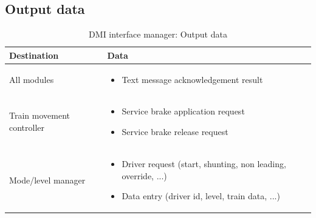 \documentclass[nocc]{template/openetcs_report}
\begin{document}
\subsection{Output data}
			\begin{longtable}{|l|l|}
				\caption{DMI interface manager: Output data}\\ 
				\hline
				
					\begin{minipage}[t]{0.35\linewidth} \textbf{Destination}	\end{minipage} 
				&	\begin{minipage}[t]{0.65\linewidth} \textbf{Data} \end{minipage} \\
				
				\hline
																																									
					\begin{minipage}[t]{0.35\linewidth} All modules	\end{minipage} 
				&	\begin{minipage}[t]{0.65\linewidth}
						\begin{itemize}
							\item Text message acknowledgement result
						\end{itemize}
					\end{minipage} \\
				
				\hline
				
					\begin{minipage}[t]{0.35\linewidth} Train movement controller	\end{minipage} 
				&	\begin{minipage}[t]{0.65\linewidth}
						\begin{itemize}
							\item Service brake application request
							\item Service brake release request
						\end{itemize}			
					\end{minipage} \\
				
				\hline

					\begin{minipage}[t]{0.35\linewidth} Mode/level manager	\end{minipage} 
				&	\begin{minipage}[t]{0.65\linewidth}
						\begin{itemize}
							\item Driver request (start, shunting, non leading, override, ...)
							\item Data entry (driver id, level, train data, ...)
						\end{itemize}			
					\end{minipage} \\
				

\end{longtable}
\end{document}
